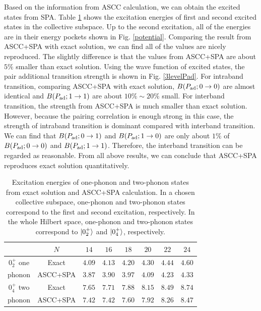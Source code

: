 \documentclass[%
superscriptaddress,
showpacs,
nofootinbib,
amsmath,amssymb,
aps,
prc,
twocolumn,
floatfix ]%
{revtex4-1}
\begin{document}
Based on the information from ASCC calculation, we can obtain the excited states from SPA.
Table \ref{ex} shows the excitation energies of first and second excited states in the collective subspace. Up to the second excitation, all of the energies are in their energy pockets shown in Fig. \ref{potential}. Comparing the result from ASCC+SPA with exact solution, we can find all of the values are nicely reproduced. The slightly difference is that the values from ASCC+SPA are about $5\%$ smaller than exact solution. 
Using the wave function of excited states, the pair additional transition strength is shown in Fig. \ref{3levelPad}. For intraband transition, comparing ASCC+SPA with exact solution, $B(P_{\rm ad};0\rightarrow 0)$ are almost identical and $B(P_{\rm ad};1\rightarrow 1)$ are about $10\%\sim20\%$ small. 
For interband transition, the strength from ASCC+SPA is much smaller than exact solution. However, because the pairing correlation is enough strong in this case, the strength of intraband transition is dominant compared with interband transition. We can find that $B(P_{\rm ad};0\rightarrow 1)$ and $B(P_{\rm ad};1\rightarrow 0)$ are only about $1\%$ of $B(P_{\rm ad};0\rightarrow 0)$ and $B(P_{\rm ad};1\rightarrow 1)$. Therefore, the interband transition can be regarded as reasonable. From all above results, we can conclude that ASCC+SPA reproduces exact solution quantitatively. 
\begin{table}[htbp]
\begin{ruledtabular}
\begin{tabular}{c|c|cccccc}
            & $N$ & $14$ & $16$ & $18$ & $20$ & $22$ & $24$\\ \hline
$0_2^+$ one & Exact & $4.09$ & $4.13$ & $4.20$ & $4.30$ & $4.44$ & $4.60$\\
phonon &ASCC+SPA & $3.87$ & $3.90$ & $3.97$ & $4.09$ & $4.23$ & $4.33$\\ \hline
$0_4^+$ two & Exact & $7.65$ & $7.71$ & $7.88$ & $8.15$ & $8.49$ & $8.74$\\
phonon &ASCC+SPA & $7.42$ & $7.42$ & $7.60$ & $7.92$ & $8.26$ & $8.47$\\
\end{tabular}
\end{ruledtabular}
\caption{Excitation energies of one-phonon and two-phonon states from exact solution and ASCC+SPA calculation. In a chosen collective subspace, one-phonon and two-phonon states correspond to the first and second excitation, respectively. In the whole Hilbert space, one-phonon and two-phonon states correspond to $\ket{0_2^+}$ and $\ket{0_4^+}$, respectively.}
\label{ex}
\end{table}
\end{document}
